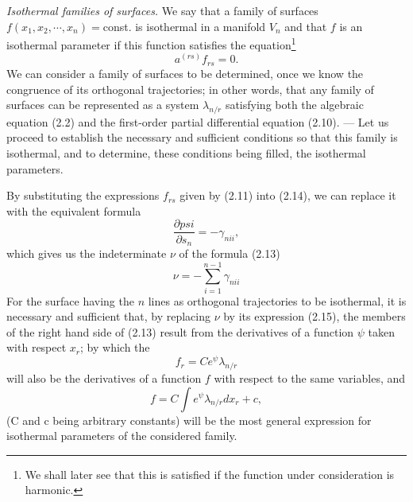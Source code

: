 \documentclass{book}
\begin{document}
\emph{Isothermal families of surfaces.} We say that a family of surfaces\\
$f(x_1,x_2,\cdots,x_n)=$const. is isothermal in a manifold $V_n$ and that $f$ is an isothermal parameter if this function satisfies the equation\footnote{We shall later see that this is satisfied if the function under consideration is harmonic.}
\begin{equation}
a^{(rs)}f_{rs}=0.
\end{equation}
We can consider a family of surfaces to be determined, once we know the congruence of its orthogonal trajectories; in other words, that any family of surfaces can be represented as a system $\lambda_{n/r}$ satisfying both the algebraic equation (2.2) and the first-order partial differential equation (2.10). --- Let us proceed to establish the necessary and sufficient conditions so that this family is isothermal, and to determine, these conditions being filled, the isothermal parameters. 

By substituting the expressions $f_{rs}$ given by (2.11) into (2.14), we can replace it with the equivalent formula
$$\frac{\partial psi}{\partial s_n}=-\gamma_{nii},$$
which gives us the indeterminate $\nu$ of the formula (2.13)
\begin{equation}
\nu=-\sum_{i=1}^{n-1}\gamma_{nii}
\end{equation}
For the surface having the $n$ lines as orthogonal trajectories to be isothermal, it is necessary and sufficient that, by replacing $\nu$ by its expression (2.15), the members of the right hand side of (2.13) result from the derivatives of a function $\psi$ taken with respect $x_r$; by which the
$$f_r=Ce^\psi\lambda_{n/r}$$
will also be the derivatives of a function $f$ with respect to the same variables, and
$$f=C\int e^\psi\lambda_{n/r}dx_r+c,$$
(C and c being arbitrary constants) will be the most general expression for isothermal parameters of the considered family. 
\end{document}
